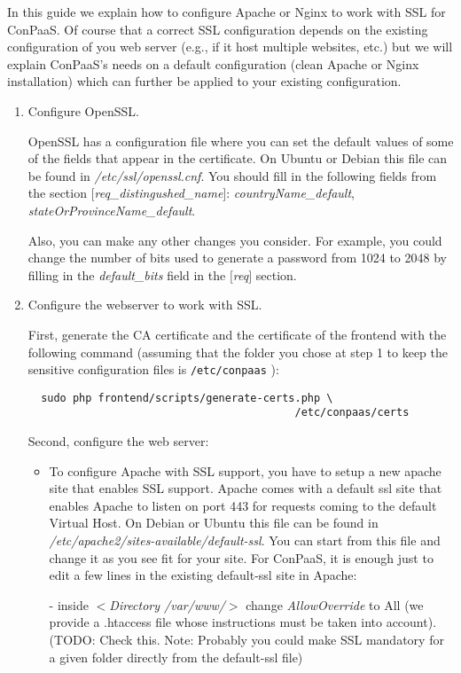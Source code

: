 \documentclass[10pt]{article}
\begin{document}
In this guide we explain how to configure Apache or Nginx to work with
SSL for ConPaaS. Of course that a correct SSL configuration depends on the
existing configuration of you web server (e.g., if it host multiple
websites, etc.) but we will explain ConPaaS's needs on a default configuration
(clean Apache or Nginx installation) which can further be applied to 
your existing configuration.

\begin{enumerate}[resume]
\item Configure OpenSSL.

  OpenSSL has a configuration file where you can set the default values of
  some of the fields that appear in the certificate. On Ubuntu or Debian
  this file can be found in \textit{/etc/ssl/openssl.cnf}. You should fill
  in the following fields from the section $[$\textit{req\_distingushed\_name}$]$:
  \textit{countryName\_default}, \textit{stateOrProvinceName\_default}.

  Also, you can make any other changes you consider. For example, you could
  change the number of bits used to generate a password from 1024 to 2048
  by filling in the \textit{default\_bits} field in the $[$\textit{req}$]$ section.

\item Configure the webserver to work with SSL.

  First, generate the CA certificate and the certificate of the frontend
  with the following command (assuming that the folder you chose at step
  1 to keep the sensitive configuration files is \verb+/etc/conpaas+ ):
  \begin{verbatim}
  sudo php frontend/scripts/generate-certs.php \
                                          /etc/conpaas/certs
  \end{verbatim}
  Second, configure the web server:
  \begin{itemize}
    \item To configure Apache with SSL support, you have to setup a new apache
      site that enables SSL support. Apache comes with a default ssl site that
      enables Apache to listen on port 443 for requests coming to the default
      Virtual Host. On Debian or Ubuntu this file can be found in
      \textit{/etc/apache2/sites-available/default-ssl}. You can start from this file
      and change it as you see fit for your site. For ConPaaS, it is enough just to
      edit a few lines in the existing default-ssl site in Apache:

      - inside $<$\textit{Directory /var/www/}$>$ change \textit{AllowOverride}
        to All (we provide a .htaccess file whose instructions must be taken
        into account).
        (TODO: Check this. Note: Probably you
        could make SSL mandatory for a given folder directly from the default-ssl file)


\end{itemize}
\end{enumerate}
\end{document}
